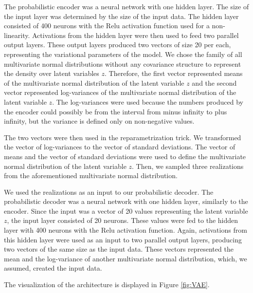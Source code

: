 The probabilistic encoder was a neural network with one hidden layer.
The size of the input layer was determined by the size of the input data.
The hidden layer consisted of 400 neurons with the Relu activation function used for a non-linearity.
Activations from the hidden layer were then used to feed two parallel output layers.
These output layers produced two vectors of size 20 per each, representing the variational parameters of the model.
We chose the family of all multivariate normal distributions without any covariance structure to represent the density over latent variables $z$.
Therefore, the first vector represented means of the multivariate normal distribution of the latent variable $z$ and the second vector represented log-variances of the multivariate normal distribution of the latent variable $z$.
The log-variances were used because the numbers produced by the encoder could possibly be from the interval from minus infinity to plus infinity, but the variance is defined only on non-negative values.

The two vectors were then used in the reparametrization trick.
We transformed the vector of log-variances to the vector of standard deviations.
The vector of means and the vector of standard deviations were used to define the multivariate normal distribution of the latent variable $z$.
Then, we sampled three realizations from the aforementioned multivariate normal distribution.

We used the realizations as an input to our probabilistic decoder.
The probabilistic decoder was a neural network with one hidden layer, similarly to the encoder.
Since the input was a vector of 20 values representing the latent variable $z$, the input layer consisted of 20 neurons.
These values were fed to the hidden layer with 400 neurons with the Relu activation function.
Again, activations from this hidden layer were used as an input to two parallel output layers, producing two vectors of the same size as the input data.
These vectors represented the mean and the log-variance of another multivariate normal distribution, which, we assumed, created the input data.

The visualization of the architecture is displayed in Figure \ref{fig:VAE}.


